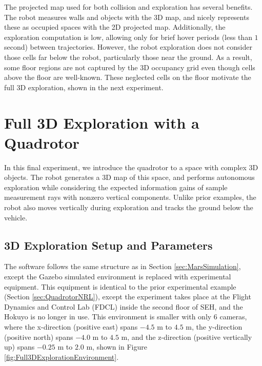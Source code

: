 The projected map used for both collision and exploration has several benefits. The robot measures walls and objects with the 3D map, and nicely represents these as occupied spaces with the 2D projected map. Additionally, the exploration computation is low, allowing only for brief hover periods (less than $1$ second) between trajectories. However, the robot exploration does not consider those cells far below the robot, particularly those near the ground. As a result, some floor regions are not captured by the 3D occupancy grid even though cells above the floor are well-known. These neglected cells on the floor motivate the full 3D exploration, shown in the next experiment.



\sectionbreak{\clearpage}
\section{Full 3D Exploration with a Quadrotor}
\label{sec:QuadrotorSEH}

In this final experiment, we introduce the quadrotor to a space with complex 3D objects. The robot generates a 3D map of this space, and performs autonomous exploration while considering the expected information gains of sample measurement rays with nonzero vertical components. Unlike prior examples, the robot also moves vertically during exploration and tracks the ground below the vehicle.

\subsection{3D Exploration Setup and Parameters}
The software follows the same structure as in Section \ref{sec:MarsSimulation}, except the Gazebo simulated environment is replaced with experimental equipment. This equipment is identical to the prior experimental example (Section \ref{sec:QuadrotorNRL}), except the experiment takes place at the Flight Dynamics and Control Lab (FDCL) inside the second floor of SEH, and the Hokuyo is no longer in use. This environment is smaller with only $6$ cameras, where the x-direction (positive east) spans $-4.5$ m to $4.5$ m, the y-direction (positive north) spans $-4.0$ m to $4.5$ m, and the z-direction (positive vertically up) spans $-0.25$ m to $2.0$ m, shown in Figure \ref{fig:Full3DExplorationEnvironment}.

